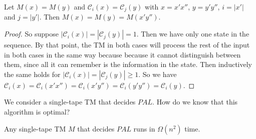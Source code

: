 \documentclass[usletter]{article}
\begin{document}
\begin{claim}
Let $M(x) = M(y)$ and $\mathcal{C}_i(x) = \mathcal{C}_j(y)$ with $x = x'x''$, $y = y'y''$, $i = |x'|$ and $j = |y'|$. Then $M(x) = M(y) = M(x'y'')$.
\label{crossingseq}
\end{claim}
\noindent
\begin{proof}
So suppose $|\mathcal{C}_i(x)| = |\mathcal{C}_j(y)| = 1$. Then we have only one state in the sequence. By that point, the TM in both cases will process the rest of the input in both cases in the same way because because it cannot distinguish between them, since all it can remember is the information in the state. Then inductively the same holds for $|\mathcal{C}_i(x)| = |\mathcal{C}_j(y)| \geq 1$. So we have $\mathcal{C}_i(x) = \mathcal{C}_i(x' x'') = \mathcal{C}_i(x' y'') = \mathcal{C}_i(y' y'') = \mathcal{C}_i(y)$.
 

\end{proof}
\noindent
We consider a single-tape TM that decides $PAL$. How do we know that this algorithm is optimal?

\begin{theorem}
Any single-tape TM $M$ that decides $PAL$ runs in $\Omega(n^2)$ time.
\end{theorem}
\end{document}
